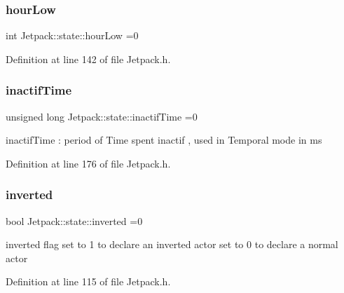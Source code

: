 \mbox{\label{struct_jetpack_1_1state_a9bd1b9e85800cfbec989ce40d1e9e08a}} 
\subsubsection{\texorpdfstring{hour\+Low}{hourLow}}
{\footnotesize\ttfamily int Jetpack\+::state\+::hour\+Low =0}



Definition at line 142 of file Jetpack.\+h.

\mbox{\label{struct_jetpack_1_1state_aaf817b1f9e7a4d65b9e3ca4726b281f6}} 
\subsubsection{\texorpdfstring{inactif\+Time}{inactifTime}}
{\footnotesize\ttfamily unsigned long Jetpack\+::state\+::inactif\+Time =0}

inactif\+Time \+: period of Time spent inactif , used in Temporal mode in ms 

Definition at line 176 of file Jetpack.\+h.

\mbox{\label{struct_jetpack_1_1state_a6bc03bb8f05b10aa142dbb0c39c87fb5}} 
\subsubsection{\texorpdfstring{inverted}{inverted}}
{\footnotesize\ttfamily bool Jetpack\+::state\+::inverted =0}

inverted flag set to 1 to declare an inverted actor set to 0 to declare a normal actor 

Definition at line 115 of file Jetpack.\+h.

\mbox{\label{struct_jetpack_1_1state_a8c26c18b0ec449b7545934cb01cca028}} 
